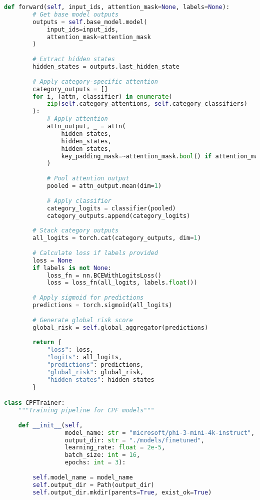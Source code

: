 \documentclass[11pt,a4paper]{article}
\begin{document}
\begin{lstlisting}[language=Python, caption=CPF Model Training Pipeline]
    def forward(self, input_ids, attention_mask=None, labels=None):
        # Get base model outputs
        outputs = self.base_model.model(
            input_ids=input_ids,
            attention_mask=attention_mask
        )
        
        # Extract hidden states
        hidden_states = outputs.last_hidden_state
        
        # Apply category-specific attention
        category_outputs = []
        for i, (attn, classifier) in enumerate(
            zip(self.category_attentions, self.category_classifiers)
        ):
            # Apply attention
            attn_output, _ = attn(
                hidden_states, 
                hidden_states, 
                hidden_states,
                key_padding_mask=~attention_mask.bool() if attention_mask is not None else None
            )
            
            # Pool attention output
            pooled = attn_output.mean(dim=1)
            
            # Apply classifier
            category_logits = classifier(pooled)
            category_outputs.append(category_logits)
        
        # Stack category outputs
        all_logits = torch.cat(category_outputs, dim=1)
        
        # Calculate loss if labels provided
        loss = None
        if labels is not None:
            loss_fn = nn.BCEWithLogitsLoss()
            loss = loss_fn(all_logits, labels.float())
        
        # Apply sigmoid for predictions
        predictions = torch.sigmoid(all_logits)
        
        # Generate global risk score
        global_risk = self.global_aggregator(predictions)
        
        return {
            "loss": loss,
            "logits": all_logits,
            "predictions": predictions,
            "global_risk": global_risk,
            "hidden_states": hidden_states
        }

class CPFTrainer:
    """Training pipeline for CPF models"""
    
    def __init__(self,
                 model_name: str = "microsoft/phi-3-mini-4k-instruct",
                 output_dir: str = "./models/finetuned",
                 learning_rate: float = 2e-5,
                 batch_size: int = 16,
                 epochs: int = 3):
        
        self.model_name = model_name
        self.output_dir = Path(output_dir)
        self.output_dir.mkdir(parents=True, exist_ok=True)
        

\end{lstlisting}
\end{document}
